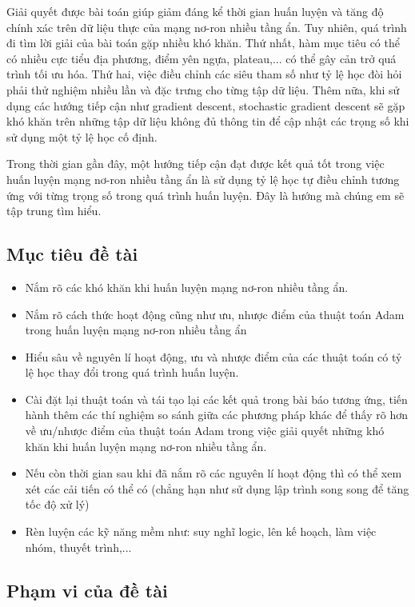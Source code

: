 \documentclass{article}[14pt]
\begin{document}
{   Giải quyết được bài toán giúp giảm đáng kể thời gian huấn luyện và tăng độ chính xác trên dữ liệu thực của mạng nơ-ron nhiều tầng ẩn. Tuy nhiên, quá trình đi tìm lời giải của bài toán gặp nhiều khó khăn. Thứ nhất, hàm mục tiêu có thể có nhiều cực tiểu địa phương, điểm yên ngựa, plateau,... có thể gây cản trở quá trình tối ưu hóa. Thứ hai, việc điều chỉnh các siêu tham số như tỷ lệ học đòi hỏi phải thử nghiệm nhiều lần và đặc trưng cho từng tập dữ liệu. Thêm nữa, khi sử dụng các hướng tiếp cận như gradient descent, stochastic gradient descent sẽ gặp khó khăn trên những tập dữ liệu không đủ thông tin để cập nhật các trọng số khi sử dụng một tỷ lệ học cố định.
   
   Trong thời gian gần đây, một hướng tiếp cận đạt được kết quả tốt trong việc huấn luyện mạng nơ-ron nhiều tầng ẩn là sử dụng tỷ lệ học tự điều chỉnh tương ứng với từng trọng số trong quá trình huấn luyện. Đây là hướng mà chúng em sẽ tập trung tìm hiểu.
    
    \subsection{Mục tiêu đề tài}
    
    \begin{itemize}
        \item Nắm rõ các khó khăn khi huấn luyện mạng nơ-ron nhiều tầng ẩn.
        \item Nắm rõ cách thức hoạt động cũng như ưu, nhược điểm của thuật toán Adam trong huấn luyện mạng nơ-ron nhiều tầng ẩn
        \item Hiểu sâu về nguyên lí hoạt động, ưu và nhược điểm của các thuật toán có tỷ lệ học thay đổi trong quá trình huấn luyện.
        \item Cài đặt lại thuật toán và tái tạo lại các kết quả trong bài báo tương ứng, tiến hành thêm các thí nghiệm so sánh giữa các phương pháp khác để thấy rõ hơn về ưu/nhược điểm của thuật toán Adam trong việc giải quyết những khó khăn khi huấn luyện mạng nơ-ron nhiều tầng ẩn.
        \item Nếu còn thời gian sau khi đã nắm rõ các nguyên lí hoạt động thì có thể xem xét các cải tiến có thể có (chẳng hạn như sử dụng lập trình song song để tăng tốc độ xử lý)
        \item Rèn luyện các kỹ năng mềm như: suy nghĩ logic, lên kế hoạch, làm việc nhóm, thuyết trình,...
    \end{itemize}
    
    \subsection{Phạm vi của đề tài}
    
}
\end{document}
